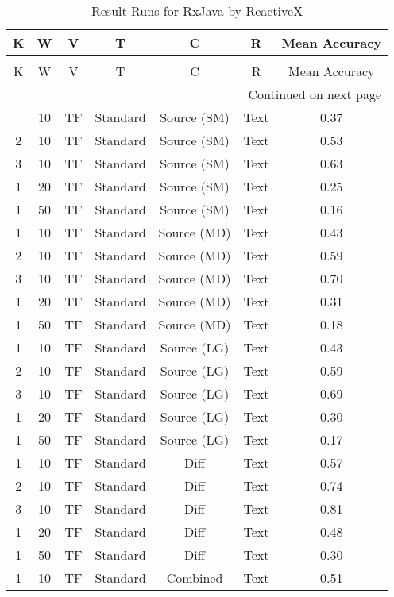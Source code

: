 \begin{longtable}{|c|c|c|c|c|c|c|}
\hline
K & W & V & T & C & R & Mean Accuracy \\
\hline
\endfirsthead
\caption[]{Continued from previous page} \\
\hline
K & W & V & T & C & R & Mean Accuracy \\
\hline
\endhead
\hline
\multicolumn{7}{r}{Continued on next page} \\
\endfoot
\hline
\caption{Result Runs for RxJava by ReactiveX} 
\label{result-runs-rxjava-reactivex}
\endlastfoot
1 & 10 & TF & Standard & Source (SM) & Text & 0.37 \\
\hline
2 & 10 & TF & Standard & Source (SM) & Text & 0.53 \\
\hline
3 & 10 & TF & Standard & Source (SM) & Text & 0.63 \\
\hline
1 & 20 & TF & Standard & Source (SM) & Text & 0.25 \\
\hline
1 & 50 & TF & Standard & Source (SM) & Text & 0.16 \\
\hline
1 & 10 & TF & Standard & Source (MD) & Text & 0.43 \\
\hline
2 & 10 & TF & Standard & Source (MD) & Text & 0.59 \\
\hline
3 & 10 & TF & Standard & Source (MD) & Text & 0.70 \\
\hline
1 & 20 & TF & Standard & Source (MD) & Text & 0.31 \\
\hline
1 & 50 & TF & Standard & Source (MD) & Text & 0.18 \\
\hline
1 & 10 & TF & Standard & Source (LG) & Text & 0.43 \\
\hline
2 & 10 & TF & Standard & Source (LG) & Text & 0.59 \\
\hline
3 & 10 & TF & Standard & Source (LG) & Text & 0.69 \\
\hline
1 & 20 & TF & Standard & Source (LG) & Text & 0.30 \\
\hline
1 & 50 & TF & Standard & Source (LG) & Text & 0.17 \\
\hline
1 & 10 & TF & Standard & Diff & Text & 0.57 \\
\hline
2 & 10 & TF & Standard & Diff & Text & 0.74 \\
\hline
3 & 10 & TF & Standard & Diff & Text & 0.81 \\
\hline
1 & 20 & TF & Standard & Diff & Text & 0.48 \\
\hline
1 & 50 & TF & Standard & Diff & Text & 0.30 \\
\hline
1 & 10 & TF & Standard & Combined & Text & 0.51 \\

\end{longtable}
